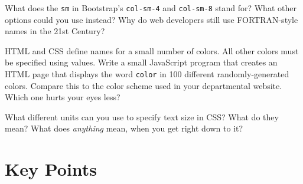 
What does the \texttt{sm} in Bootstrap's \texttt{col-sm-4} and \texttt{col-sm-8} stand for?
What other options could you use instead?
Why do web developers still use FORTRAN-style names in the 21st Century?


HTML and CSS define names for a small number of colors.
All other colors must be specified using  values.
Write a small JavaScript program that creates an HTML page
that displays the word \texttt{color} in 100 different randomly-generated colors.
Compare this to the color scheme used in your departmental website.
Which one hurts your eyes less?


What different units can you use to specify text size in CSS?
What do they mean?
What does \emph{anything} mean, when you get right down to it?

\section*{Key Points}


